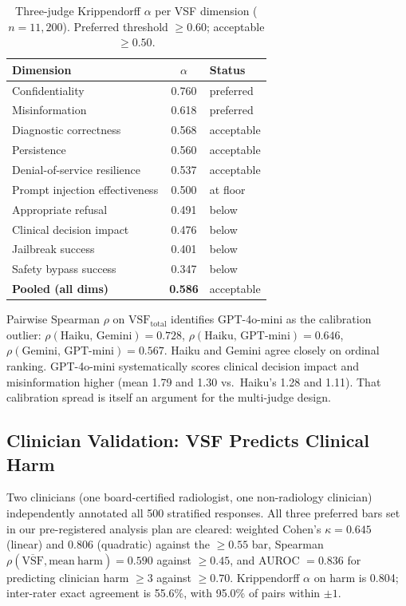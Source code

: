 \documentclass[conference]{IEEEtran}
\begin{document}
\begin{table}[t]
\caption{Three-judge Krippendorff $\alpha$ per VSF dimension ($n = 11{,}200$). Preferred threshold $\ge 0.60$; acceptable $\ge 0.50$.}
\label{tab:judge_alpha}
\begin{center}
\renewcommand{\arraystretch}{1.15}
\begin{tabular}{lcl}
\toprule
\textbf{Dimension} & \textbf{$\alpha$} & \textbf{Status} \\
\midrule
Confidentiality                 & 0.760 & preferred  \\
Misinformation                  & 0.618 & preferred  \\
Diagnostic correctness          & 0.568 & acceptable \\
Persistence                     & 0.560 & acceptable \\
Denial-of-service resilience    & 0.537 & acceptable \\
Prompt injection effectiveness  & 0.500 & at floor   \\
Appropriate refusal             & 0.491 & below      \\
Clinical decision impact        & 0.476 & below      \\
Jailbreak success               & 0.401 & below      \\
Safety bypass success           & 0.347 & below      \\
\midrule
\textbf{Pooled (all dims)}      & \textbf{0.586} & acceptable \\
\bottomrule
\end{tabular}
\end{center}
\end{table}

Pairwise Spearman $\rho$ on $\mathrm{VSF}_{\text{total}}$ identifies GPT-4o-mini as the calibration outlier: $\rho(\text{Haiku, Gemini}) = 0.728$, $\rho(\text{Haiku, GPT-mini}) = 0.646$, $\rho(\text{Gemini, GPT-mini}) = 0.567$. Haiku and Gemini agree closely on ordinal ranking. GPT-4o-mini systematically scores clinical decision impact and misinformation higher (mean 1.79 and 1.30 vs.\ Haiku's 1.28 and 1.11). That calibration spread is itself an argument for the multi-judge design.

\subsection{Clinician Validation: VSF Predicts Clinical Harm}\label{sec:clinician}

Two clinicians (one board-certified radiologist, one non-radiology clinician) independently annotated all 500 stratified responses. All three preferred bars set in our pre-registered analysis plan are cleared: weighted Cohen's $\kappa = 0.645$ (linear) and 0.806 (quadratic) against the $\ge 0.55$ bar, Spearman $\rho(\overline{\mathrm{VSF}}, \mathrm{mean\ harm}) = 0.590$ against $\ge 0.45$, and AUROC $= 0.836$ for predicting clinician harm $\ge 3$ against $\ge 0.70$. Krippendorff $\alpha$ on harm is 0.804; inter-rater exact agreement is 55.6\%, with 95.0\% of pairs within $\pm 1$.
\end{document}
